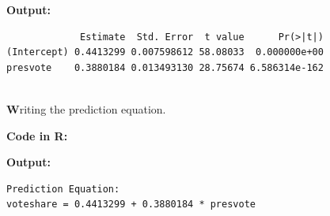 \documentclass[12pt,letterpaper]{article}
\begin{document}
\begin{enumerate}
		\noindent \textbf{Output: }
		\begin{verbatim}
             Estimate  Std. Error  t value      Pr(>|t|)
(Intercept) 0.4413299 0.007598612 58.08033  0.000000e+00
presvote    0.3880184 0.013493130 28.75674 6.586314e-162
			
		\end{verbatim}  
		\vspace{.25cm}
		
	\noindent \textbf Writing the prediction equation. 

\noindent \textbf{Code in R:}
  
\vspace{.25cm}

\noindent \textbf{Output: }
\begin{verbatim}
Prediction Equation: 
voteshare = 0.4413299 + 0.3880184 * presvote
\end{verbatim}  

		\vspace{1 cm}
	\end{enumerate}
	

\newpage	
\end{document}
